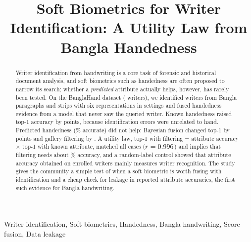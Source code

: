 \documentclass[conference]{IEEEtran}
\begin{document}
\title{Soft Biometrics for Writer Identification: A Utility Law from Bangla Handedness}


\maketitle

\begin{abstract}
Writer identification from handwriting is a core task of forensic and historical document analysis, and soft biometrics such as handedness are often proposed to narrow its search; whether a \emph{predicted} attribute actually helps, however, has rarely been tested. On the BanglaHand dataset (\vnWriters{} writers), we identified writers from Bangla paragraphs and strips with six representations in \vnSettings{} settings and fused handedness evidence from a model that never saw the queried writer. Known handedness raised top-1 accuracy by \vOracleGain{} points, because identification errors were unrelated to hand. Predicted handedness (\vHandOwn\% accurate) did not help: Bayesian fusion changed top-1 by \vBayesGain{} points and gallery filtering by \vFilterGain{}. A utility law, top-1 with filtering = attribute accuracy $\times$ top-1 with known attribute, matched all \vLawN{} cases ($r=0.996$) and implies that filtering needs about \vThreshMed\% accuracy, and a random-label control showed that attribute accuracy obtained on enrolled writers mainly measures writer recognition. The study gives the community a simple test of when a soft biometric is worth fusing with identification and a cheap check for leakage in reported attribute accuracies, the first such evidence for Bangla handwriting.
\end{abstract}

\begin{IEEEkeywords}
Writer identification, Soft biometrics, Handedness, Bangla handwriting, Score fusion, Data leakage
\end{IEEEkeywords}
\end{document}
